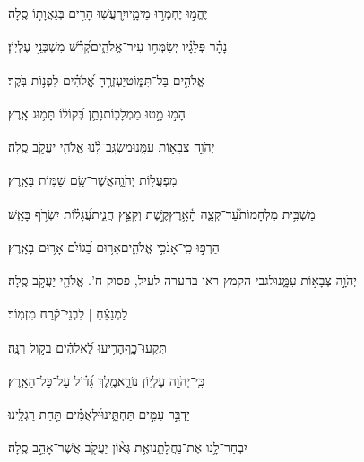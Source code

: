 \documentclass[12pt]{article}
\newcommand{\loc}[1]{\textsuperscript{\locf{#1}}}
\begin{document}
{\loc{ ד}~}‏יֶהֱמ֣וּ יֶחְמְר֣וּ מֵימָ֑יו{\hfill}יִ֥רְעֲשֽׁוּ הָרִ֖ים בְּגַאֲוָת֣וֹ סֶֽלָה׃\par

{\loc{ ה}~}‏נָהָ֗ר פְּלָגָ֗יו יְשַׂמְּח֥וּ עִיר־אֱלֹהִ֑ים{\hfill}קְ֝דֹ֗שׁ מִשְׁכְּנֵ֥י עֶלְיֽוֹן׃\par

{\loc{ ו}~}‏אֱלֹהִ֣ים  בַּל־תִּמּ֑וֹט{\hfill}יַעְזְרֶ֥הָ אֱ֝לֹהִ֗ים לִפְנ֥וֹת בֹּֽקֶר׃\par

{\loc{ ז}~}‏הָמ֣וּ  מָ֣טוּ מַמְלָכ֑וֹת{\hfill}נָתַ֥ן בְּ֝קוֹל֗וֹ תָּמ֥וּג אָֽרֶץ׃\par

{\loc{ ח}~}‏יְהֹוָ֣ה צְבָא֣וֹת עִמָּ֑נוּ{\hfill}מִשְׂגָּֽב־לָ֨נוּ אֱלֹהֵ֖י יַעֲקֹ֣ב סֶֽלָה׃\par

{\loc{ ט}~}‏ מִפְעֲל֣וֹת יְהֹוָ֑ה{\hfill}אֲשֶׁר־שָׂ֖ם שַׁמּ֣וֹת בָּאָֽרֶץ׃\par

{\loc{ י}~}‏מַשְׁבִּ֥ית מִלְחָמוֹת֮{\hfill}עַד־קְצֵ֢ה הָ֫אָ֥רֶץ\newline\hspace*{.5em}קֶ֣שֶׁת  וְקִצֵּ֣ץ חֲנִ֑ית{\hfill}עֲ֝גָל֗וֹת יִשְׂרֹ֥ף בָּאֵֽשׁ׃\par

{\loc{ יא}~}‏הַרְפּ֣וּ  כִּֽי־אָנֹכִ֣י אֱלֹהִ֑ים{\hfill}אָר֥וּם בַּ֝גּוֹיִ֗ם אָר֥וּם בָּאָֽרֶץ׃\par

{\loc{ יב}~}‏יְהֹוָ֣ה צְבָא֣וֹת עִמָּ֑נוּ{\hfill}לגבי הקמץ ראו בהערה לעיל, פסוק ח'. אֱלֹהֵ֖י יַעֲקֹ֣ב סֶֽלָה׃\par\pend

\pstart[\subsection*{\textcolor{red}{פרק מז}}]\label{פרק מז}
{\loc{ א}~}‏לַמְנַצֵּ֬חַ | לִבְנֵי־קֹ֬רַח מִזְמֽוֹר׃\par

{\loc{ ב}~}‏ תִּקְעוּ־כָ֑ף{\hfill}הָרִ֥יעוּ לֵ֝אלֹהִ֗ים בְּק֣וֹל רִנָּֽה׃\par

{\loc{ ג}~}‏כִּֽי־יְהֹוָ֣ה עֶלְי֣וֹן נוֹרָ֑א{\hfill}מֶ֥לֶךְ גָּ֝ד֗וֹל עַל־כׇּל־הָאָֽרֶץ׃\par

{\loc{ ד}~}‏יַדְבֵּ֣ר עַמִּ֣ים תַּחְתֵּ֑ינוּ{\hfill}וּ֝לְאֻמִּ֗ים תַּ֣חַת רַגְלֵֽינוּ׃\par

{\loc{ ה}~}‏יִבְחַר־לָ֥נוּ אֶת־נַחֲלָתֵ֑נוּ{\hfill}אֶ֥ת גְּא֨וֹן יַעֲקֹ֖ב אֲשֶׁר־אָהֵ֣ב סֶֽלָה׃\par
\end{document}
